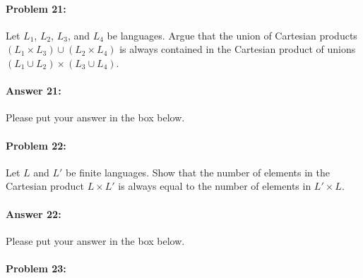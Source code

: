\documentclass[10pt]{article}
\newenvironment{AnswerBox}{\begin{mdframed}[style=simple]}{\end{mdframed}}
\begin{document}
\noindent\hrulefill %

\paragraph{Problem 21:}
Let $L_1$, $L_2$, $L_3$, and $L_4$ be languages. Argue that the union of
Cartesian products \newline${(L_1 \times L_3) \cup (L_2 \times L_4)}$ is always contained
in the Cartesian product of unions $(L_1 \cup L_2) \times (L_3 \cup L_4)$.

\paragraph{Answer 21:} Please put your answer in the box below.

\begin{AnswerBox}%


\end{AnswerBox}%

\noindent\hrulefill %

\paragraph{Problem 22:}
Let $L$ and $L'$ be finite languages. Show that the number of elements in the
Cartesian product $L \times L'$ is always equal to the number of elements in $L'
\times L$.

\paragraph{Answer 22:} Please put your answer in the box below.

\begin{AnswerBox}%


\end{AnswerBox}%

\noindent\hrulefill %

\paragraph{Problem 23:}
\end{document}
